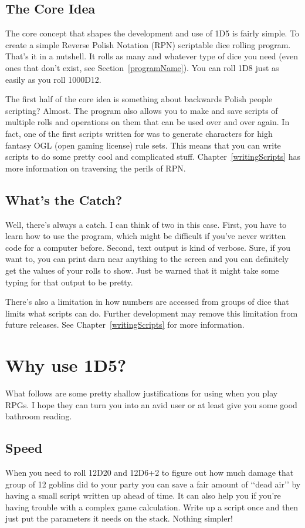 \subsection*{The Core Idea}
\label{coreidea}
The core concept that shapes the development and use of 1D5 is fairly simple.
To create a simple Reverse Polish Notation (RPN) scriptable dice rolling
program. That's it in a nutshell. It rolls as many and whatever type of dice
you need (even ones that don't exist, see Section~\ref{programName}). You
can roll 1D8 just as easily as you roll 1000D12.

The first half of the core idea is something about backwards Polish people
scripting? Almost. The program also allows you to make and save scripts of
multiple rolls and operations on them that can be used over and over again.
In fact, one of the first scripts written for \progLogo was to generate
characters for high fantasy OGL (open gaming license) rule sets. This means
that you can write scripts to do some pretty cool and complicated stuff.
Chapter~\ref{writingScripts} has more information on traversing the perils of
RPN.

\subsection*{What's the Catch?}
\label{theCatch}
Well, there's always a catch. I can think of two in this case. First, you have
to learn how to use the program, which might be difficult if you've never
written code for a computer before. Second, text output is kind of verbose.
Sure, if you want to, you can print darn near anything to the screen
and you can definitely get the values of your rolls to show. Just be warned that
it might take some typing for that output to be pretty.

There's also a limitation in how numbers are accessed from groups of dice that
limits what scripts can do. Further development may remove this limitation from
future releases. See Chapter~\ref{writingScripts} for more information.

\section{Why use 1D5?}
\label{whyuseit}
What follows are some pretty shallow justifications for using \progLogo when
you play RPGs. I hope they can turn you into an avid user or at
least give you some good bathroom reading.

\subsection*{Speed}
\label{whyspeed}
When you need to roll 12D20 and 12D6+2 to figure out how much damage that group
of 12 goblins did to your party you can save a fair amount of \lq\lq dead
air\rq\rq
by having a small script written up ahead of time. It can also help you if
you're having trouble with a complex game calculation. Write up a script once
and then just put the parameters it needs on the stack. Nothing simpler!


